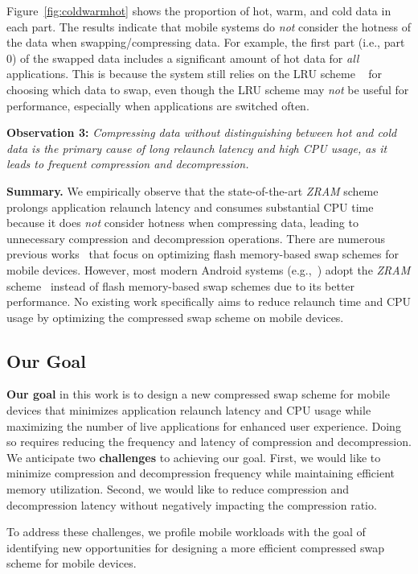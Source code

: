 Figure~\ref{fig:coldwarmhot} shows the proportion of hot, warm, and cold data in each part. 
The results indicate that mobile systems do \emph{not} consider the hotness of the data when swapping/compressing data. For example, the first part (i.e., part 0) of the swapped data includes a significant amount of hot data for \emph{all} applications. This is because the system still relies on the LRU scheme ~\cite{LRU} for choosing which data to swap, even though the LRU scheme may \emph{not} be useful for performance, especially when applications are switched often. 



\noindent\textbf{Observation 3:} \textit{Compressing data without distinguishing between hot and cold data is the primary cause of long relaunch latency and high CPU usage, as it leads to frequent compression and decompression.} 

\noindent\textbf{Summary.} We empirically observe that the state-of-the-art  \emph{ZRAM} scheme prolongs application relaunch latency and consumes substantial CPU time because it does \emph{not} consider hotness when compressing data, leading to unnecessary compression and decompression operations.
There are numerous previous works~\cite{son2021asap, bergman2022znswap, Changlong2020seal, end2024more} that focus on optimizing flash memory-based swap schemes for mobile devices. However, most modern Android systems (e.g.,~\cite{Pixel7, Pixel5, Galaxys}) adopt the \emph{ZRAM} scheme~\cite{new-zram, zram1, zram2} instead of flash memory-based swap schemes due to its better performance. No existing work specifically aims to reduce relaunch time and CPU usage by optimizing the compressed swap scheme on mobile devices. 

\subsection{Our Goal}

\textbf{Our goal} in this work is to design a new compressed swap scheme for mobile devices that minimizes application relaunch latency and CPU usage while maximizing the number of live applications for enhanced user experience. Doing so requires reducing the frequency and latency of compression and decompression. We anticipate two \textbf{challenges} to achieving our goal. First, we would like to minimize compression and decompression frequency while maintaining efficient memory utilization. Second, we would like to reduce compression and decompression latency without negatively impacting the compression ratio.

To address these challenges, we profile mobile workloads with the goal of identifying new opportunities for designing a more efficient compressed swap scheme for mobile devices.
 












